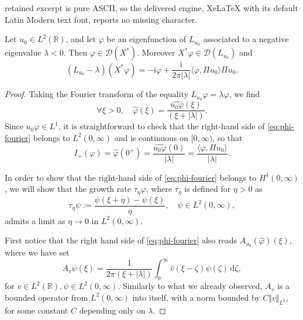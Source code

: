 \documentclass[10pt,a4paper]{amsart}
\newcommand{\R}{\mathbb{R}}
\newcommand{\dd}{\,\mathrm{d}}
\newcommand{\ii}{\mathrm{i}}
\begin{document}
retained excerpt is pure ASCII, so the delivered engine, XeLaTeX with its default Latin Modern text font, reports no missing character.
\begin{proposition}\label{prop:phi-domain}
Let $u_0\in L^2(\R)$, and let $\varphi$ be an eigenfunction of $L_{u_0}$ associated to a negative eigenvalue $\lambda<0$. Then $\varphi\in\mathcal{D}(X^*)$.
Moreover $X^*\varphi \in \mathcal {D}(L_{u_0})$ and 
\begin{equation}\label{eq:Xstarphi}
(L_{u_0}-\lambda)(X^*\varphi )=-\ii\varphi +\frac{\ii}{2\pi |\lambda|}\langle \varphi ,\Pi u_0\rangle \Pi u_0.
\end{equation}
\end{proposition}

\begin{proof}
Taking the Fourier transform of the equality $L_{u_0}\varphi=\lambda\varphi$, we find
\begin{equation}\label{eq:phi-fourier}
\forall \xi>0,\quad \widehat{\varphi}(\xi)=\frac{\widehat{u_0\varphi}(\xi)}{(\xi+|\lambda|)}.
\end{equation}
Since $u_0\varphi \in L^1$, it is straightforward to check that the right-hand side of \eqref{eq:phi-fourier} belongs to $L^2(0,\infty)$ and is continuous on $[0,\infty)$, so that
\begin{equation}\label{I+phi}
I_+(\varphi )=\widehat \varphi (0^+)=\frac{\widehat{u_0\varphi}(0)}{|\lambda|}=\frac{\langle \varphi, \Pi u_0\rangle }{|\lambda|}.
\end{equation}

In order to show that the right-hand side of \eqref{eq:phi-fourier} belongs to $H^1(0,\infty)$, we will show that the growth rate $\tau_\eta\widehat{\varphi}$, where $\tau_\eta$ is defined for $\eta>0$ as
\[
\tau_\eta \psi:=\frac{\psi(\xi+\eta)-\psi(\xi)}{\eta},
\quad \psi\in L^2(0,\infty),
\]
admits a limit as $\eta\to 0$ in $L^2(0,\infty)$.

 First notice that the right hand side of \eqref{eq:phi-fourier} also reads $A_{u_0}(\widehat \varphi) (\xi )$, where we have set
 \[ A_v \psi (\xi )=\frac{1}{2\pi (\xi +|\lambda |)}\int_0^\infty \widehat v(\xi -\zeta)\psi (\zeta)\dd\zeta ,\]
 for $v\in L^2(\R), \psi \in L^2(0,\infty )$.
Similarly to what we already observed, $A_v $ is a bounded operator from $L^2(0,\infty )$ into itself, with a norm bounded by $C\Vert v\Vert_{L^2}$, for some constant $C$ depending only on $\lambda $.


\end{proof}
\end{document}
